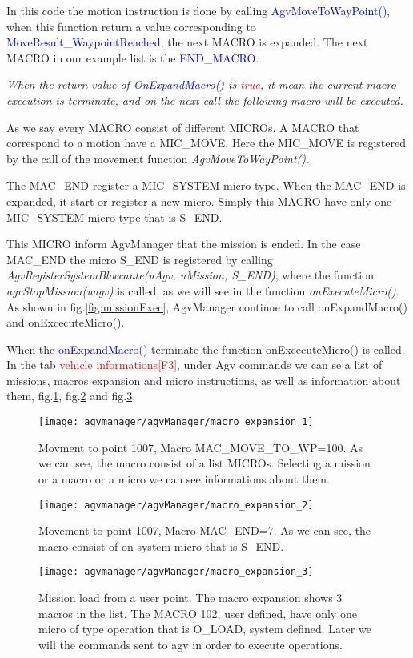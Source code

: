 In this code the motion instruction is done by calling \textcolor{blue}{AgvMoveToWayPoint()}, when this function return a value corresponding to \textcolor{blue}{MoveResult\_WaypointReached}, the next MACRO is expanded. The next MACRO in our example list is the \textcolor{blue}{END\_MACRO}.

\textit{When the return value of \textcolor{blue}{OnExpandMacro()} is \textcolor{red}{true}, it mean the current macro execution is terminate, and on the next call the following macro will be executed.} 

As we say every MACRO consist of different MICROs. A MACRO that correspond to a motion have a MIC\_MOVE. Here the MIC\_MOVE is registered by the call of the movement function \textit{AgvMoveToWayPoint()}.

The MAC\_END register a MIC\_SYSTEM micro type. When the MAC\_END is expanded, it start or register a new micro. Simply this MACRO have only one MIC\_SYSTEM micro type that is S\_END.

This MICRO inform AgvManager that the mission is ended. In the case MAC\_END the micro S\_END is registered by calling \textit{AgvRegisterSystemBloccante(uAgv, uMission, S\_END)}, where the function \textit{agvStopMission(uagv)} is called, as we will see in the function \textit{onExecuteMicro()}.\\

As shown in fig.\ref{fig:missionExec}, AgvManager continue to call onExpandMacro() and onExcecuteMicro().

When the \textcolor{blue}{onExpandMacro()} terminate the function onExcecuteMicro() is called.\\

In the tab \textcolor{red}{vehicle informations[F3]}, under Agv commands we can se a list of missions, macros expansion and micro instructions, as well as information about them, fig.\ref{fig:macro_expansion_1}, fig.\ref{fig:macro_expansion_2} and fig.\ref{fig:macro_expansion_3}.\\

\begin{figure}
	\centering\texttt{[image: agvmanager/agvManager/macro\_expansion\_1]}
	\caption{Movment to point 1007, Macro MAC\_MOVE\_TO\_WP=100. As we can see, the macro consist of a list MICROs. Selecting a mission or a macro or a micro we can see informations about them.}
	\label{fig:macro_expansion_1}
\end{figure}
\begin{figure}
	\centering\texttt{[image: agvmanager/agvManager/macro\_expansion\_2]}
	\caption{Movement to point 1007, Macro MAC\_END=7. As we can see, the macro consist of on system micro that is S\_END.}
	\label{fig:macro_expansion_2}
\end{figure}
\begin{figure}
	\centering\texttt{[image: agvmanager/agvManager/macro\_expansion\_3]}
	\caption{Mission load from a user point. The macro expansion shows 3 macros in the list. The MACRO 102, user defined, have only one micro of type operation that is O\_LOAD, system defined. Later we will the commands sent to agv in order to execute operations.}
	\label{fig:macro_expansion_3}
\end{figure}

